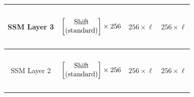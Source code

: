 \begin{table}[]
\begin{tabular}{@{}c|c|c|c@{}}
SSM Layer 3 & \begin{math}\begin{aligned} \begin{matrix} \text{\phantom{-}} \\ \end{matrix} \\ \begin{bmatrix} \text{\phantom{-} Shift \phantom{-}}   \\ \text{(standard)} \\ \end{bmatrix} \times 256 \\ \begin{matrix} \text{\phantom{-}} \\ \end{matrix} \\\end{aligned}\end{math}                                                                                                                                                                                                                                                                           & $256 \times \ell$ & $256 \times \ell$ \\ \midrule
SSM Layer 2 & \begin{math}\begin{aligned}    \begin{matrix}    \text{\phantom{-}} \\    \end{matrix}    \\    \begin{bmatrix}    \text{\phantom{-} Shift \phantom{-}}   \\ \text{(standard)} \\    \end{bmatrix}    \times 256     \\    \begin{matrix}    \text{\phantom{-}} \\    \end{matrix}    \\\end{aligned}\end{math}                                                                                                                                                                                                                                   & $256 \times \ell$ & $256 \times \ell$ \\ \midrule

\end{tabular}
\end{table}
